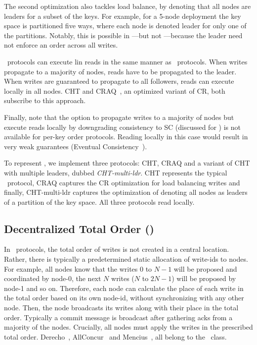 The second optimization also tackles load balance, by denoting that all nodes are leaders for a subset of the keys. For example, for a 5-node deployment the key space is partitioned five ways, where each node is denoted leader for only one of the partitions.
Notably, this is possible in \LPKO---but not \LTO---because the leader need not enforce an order across all writes. %

\LPKO~protocols can execute lin reads in the same manner as \LTO~protocols. %
When writes propagate to a majority of nodes, reads have to be propagated to the leader. When writes are guaranteed to propagate to all followers, reads can execute locally in all nodes. CHT and CRAQ~\cite{Terrace:2009}, an optimized variant of CR, both subscribe to this approach.

Finally, note that the option to propagate writes to a majority of nodes but execute reads locally by  downgrading consistency to SC (discussed for \LTO) is not available for per-key order protocols. Reading locally in this case would result in very weak guarantees (\ie Eventual Consistency~\cite{Vogels:2009}).

To represent \LPKO, we implement three protocols: CHT, CRAQ and a variant of CHT with multiple leaders, dubbed \emph{CHT-multi-ldr}. 
CHT represents the typical \LPKO~protocol, 
CRAQ captures the CR optimization for load balancing writes and %
finally, CHT-multi-ldr captures the optimization of denoting all nodes as leaders of a partition of the key space.
All three protocols read locally.





\subsection{Decentralized Total Order (\DTO)}\label{sec:tax:dto}
In \DTO\ protocols, the total order of writes is not created in a central location. Rather, 
there is typically a predetermined static allocation of write-ids to nodes. For example, 
all nodes know that the writes $0$ to $N - 1$ will be proposed and coordinated by node-0, the next $N$ writes (\ie $N$ to $2N - 1$) will be proposed by node-1 and so on.
Therefore, each node can calculate the place of each write in the total order based on its own node-id, without synchronizing with any other node. Then, the node broadcasts its writes along with their place in the total order. Typically a commit message is broadcast after gathering acks from a majority of the nodes.
Crucially, all nodes must apply the writes in the prescribed total order.
Derecho~\cite{Jha:2019}, AllConcur~\cite{Poke:2017} and Mencius~\cite{Mao:2008}, all belong to the \DTO~class.

